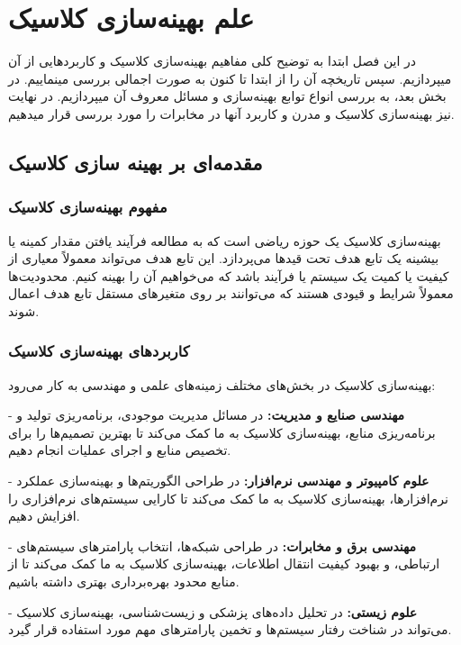 \chapter{علم بهینه‌سازی کلاسیک}
در این فصل ابتدا به توضیح کلی مفاهیم بهینه‌سازی کلاسیک و کاربرد‌هایی از آن میپردازیم. سپس تاریخچه آن را از ابتدا تا کنون به صورت اجمالی بررسی مینماییم. در بخش بعد، به بررسی انواع توابع بهینه‌سازی و مسائل معروف آن میپردازیم. در نهایت نیز بهینه‌سازی کلاسیک و مدرن و کاربرد آنها در مخابرات را مورد بررسی قرار میدهیم.
\newpage
\section{
مقدمه‌ای بر بهینه سازی کلاسیک
}

\subsection{مفهوم بهینه‌سازی کلاسیک}
\cite{2}
بهینه‌سازی کلاسیک یک حوزه ریاضی است که به مطالعه فرآیند یافتن مقدار کمینه یا بیشینه یک تابع هدف تحت قیدها می‌پردازد. این تابع هدف می‌تواند معمولاً معیاری از کیفیت یا کمیت یک سیستم یا فرآیند باشد که می‌خواهیم آن را بهینه کنیم. محدودیت‌ها معمولاً شرایط و قیودی هستند که می‌توانند بر روی متغیرهای مستقل تابع هدف اعمال شوند.

\subsection{کاربردهای بهینه‌سازی کلاسیک}

بهینه‌سازی کلاسیک در بخش‌های مختلف زمینه‌های علمی و مهندسی به کار می‌رود:

- \textbf{مهندسی صنایع و مدیریت:} در مسائل مدیریت موجودی، برنامه‌ریزی تولید و برنامه‌ریزی منابع، بهینه‌سازی کلاسیک به ما کمک می‌کند تا بهترین تصمیم‌ها را برای تخصیص منابع و اجرای عملیات انجام دهیم.

- \textbf{علوم کامپیوتر و مهندسی نرم‌افزار:} در طراحی الگوریتم‌ها و بهینه‌سازی عملکرد نرم‌افزارها، بهینه‌سازی کلاسیک به ما کمک می‌کند تا کارایی سیستم‌های نرم‌افزاری را افزایش دهیم.

- \textbf{مهندسی برق و مخابرات:} در طراحی شبکه‌ها، انتخاب پارامترهای سیستم‌های ارتباطی، و بهبود کیفیت انتقال اطلاعات، بهینه‌سازی کلاسیک به ما کمک می‌کند تا از منابع محدود بهره‌برداری بهتری داشته باشیم.

- \textbf{علوم زیستی:} در تحلیل داده‌های پزشکی و زیست‌شناسی، بهینه‌سازی کلاسیک می‌تواند در شناخت رفتار سیستم‌ها و تخمین پارامترهای مهم مورد استفاده قرار گیرد.

